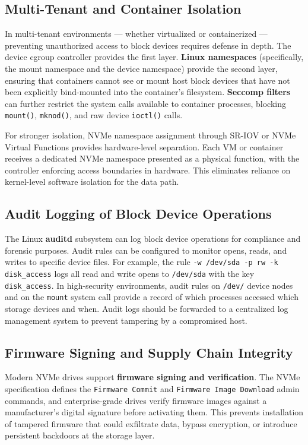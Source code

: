 \begin{securitybox}
\subsection*{Multi-Tenant and Container Isolation}

In multi-tenant environments --- whether virtualized or containerized --- preventing unauthorized access to block devices requires defense in depth. The device cgroup controller provides the first layer. \textbf{Linux namespaces} (specifically, the mount namespace and the device namespace) provide the second layer, ensuring that containers cannot see or mount host block devices that have not been explicitly bind-mounted into the container's filesystem. \textbf{Seccomp filters} can further restrict the system calls available to container processes, blocking \texttt{mount()}, \texttt{mknod()}, and raw device \texttt{ioctl()} calls.

For stronger isolation, NVMe namespace assignment through SR-IOV or NVMe Virtual Functions provides hardware-level separation. Each VM or container receives a dedicated NVMe namespace presented as a physical function, with the controller enforcing access boundaries in hardware. This eliminates reliance on kernel-level software isolation for the data path.

\subsection*{Audit Logging of Block Device Operations}

The Linux \textbf{auditd} subsystem can log block device operations for compliance and forensic purposes. Audit rules can be configured to monitor opens, reads, and writes to specific device files. For example, the rule \texttt{-w /dev/sda -p rw -k disk\_access} logs all read and write opens to \texttt{/dev/sda} with the key \texttt{disk\_access}. In high-security environments, audit rules on \texttt{/dev/} device nodes and on the \texttt{mount} system call provide a record of which processes accessed which storage devices and when. Audit logs should be forwarded to a centralized log management system to prevent tampering by a compromised host.

\subsection*{Firmware Signing and Supply Chain Integrity}

Modern NVMe drives support \textbf{firmware signing and verification}. The NVMe specification defines the \texttt{Firmware Commit} and \texttt{Firmware Image Download} admin commands, and enterprise-grade drives verify firmware images against a manufacturer's digital signature before activating them. This prevents installation of tampered firmware that could exfiltrate data, bypass encryption, or introduce persistent backdoors at the storage layer.


\end{securitybox}

